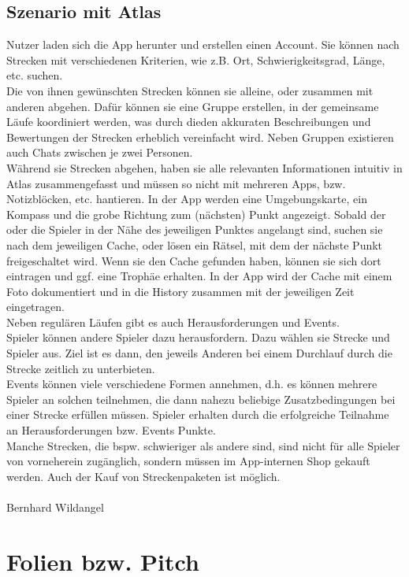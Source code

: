 \documentclass[a4paper, 12pt]{article}
\begin{document}
\subsection{Szenario mit Atlas}
Nutzer laden sich die App herunter und erstellen einen Account.
Sie können nach Strecken mit verschiedenen Kriterien, wie z.B. Ort, Schwierigkeitsgrad, Länge, etc. suchen. \\
Die von ihnen gewünschten Strecken können sie alleine, oder zusammen mit anderen abgehen. Dafür können sie eine Gruppe erstellen, in der gemeinsame Läufe koordiniert werden, was durch dieden akkuraten Beschreibungen und Bewertungen der Strecken erheblich vereinfacht wird. Neben Gruppen existieren auch Chats zwischen je zwei Personen.\\
Während sie Strecken abgehen, haben sie alle relevanten Informationen intuitiv in Atlas zusammengefasst und müssen so nicht mit mehreren Apps, bzw. Notizblöcken, etc. hantieren. In der App werden eine Umgebungskarte, ein Kompass und die grobe Richtung zum (nächsten) Punkt angezeigt. Sobald der oder die Spieler in der Nähe des jeweiligen Punktes angelangt sind, suchen sie nach dem jeweiligen Cache, oder lösen ein Rätsel, mit dem der nächste Punkt freigeschaltet wird. Wenn sie den Cache gefunden haben, können sie sich dort eintragen und ggf. eine Trophäe erhalten. In der App wird der Cache mit einem Foto dokumentiert und in die History zusammen mit der jeweiligen Zeit eingetragen.\\
Neben regulären Läufen gibt es auch Herausforderungen und Events.\\
Spieler können andere Spieler dazu herausfordern. Dazu wählen sie Strecke und Spieler aus. Ziel ist es dann, den jeweils Anderen bei einem Durchlauf durch die Strecke zeitlich zu unterbieten.\\
Events können viele verschiedene Formen annehmen, d.h. es können mehrere Spieler an solchen teilnehmen, die dann nahezu beliebige Zusatzbedingungen bei einer Strecke erfüllen müssen. Spieler erhalten durch die erfolgreiche Teilnahme an Herausforderungen bzw. Events Punkte.\\
Manche Strecken, die bspw. schwieriger als andere sind, sind nicht für alle Spieler von vorneherein zugänglich, sondern müssen im App-internen Shop gekauft werden. Auch der Kauf von Streckenpaketen ist möglich.\\
\\
Bernhard Wildangel

\section{Folien bzw. Pitch}
\end{document}
